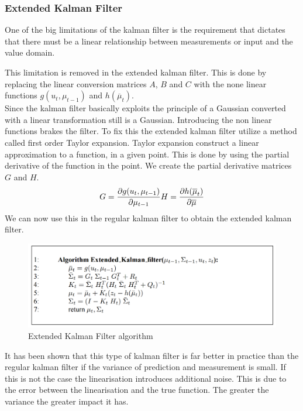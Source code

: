 \subsubsection{Extended Kalman Filter}
One of the big limitations of the kalman filter is the requirement that dictates that there must be a linear relationship between measurements or input and the value domain. 

This limitation is removed in the extended kalman filter. This is done by replacing the linear conversion matrices $A$, $B$ and $C$ with the none linear functions $g(u_t, \mu_{t-1})$ and $h(\overline{\mu}_t)$.\\

Since the kalman filter basically exploits the principle of a Gaussian converted with a linear transformation still is a Gaussian. Introducing the non linear functions brakes the filter. To fix this the extended kalman filter utilize a method called first order Taylor expansion. Taylor expansion construct a linear approximation to a function, in a given point. This is done by using the partial derivative of the function in the point. We create the partial derivative matrices $G$ and $H$.
\begin{equation}
G = \frac{\partial g(u_t, \mu_{t-1})}{\partial \mu_{t-1}} \\ H = \frac{\partial h(\overline{\mu}_t)}{\partial \overline{\mu}}
\end{equation}
We can now use this in the regular kalman filter to obtain the extended kalman filter.
\begin{figure}[H]
\centering
\includegraphics[scale=0.51]{billeder/EKF.png}
\caption{Extended Kalman Filter algorithm}
\end{figure}
It has been shown that this type of kalman filter is far better in practice than the regular kalman filter if the variance of prediction and measurement is small. If this is not the case the linearisation introduces additional noise. This is due to the error between the linearisation and the true function. The greater the variance the greater impact it has.  
